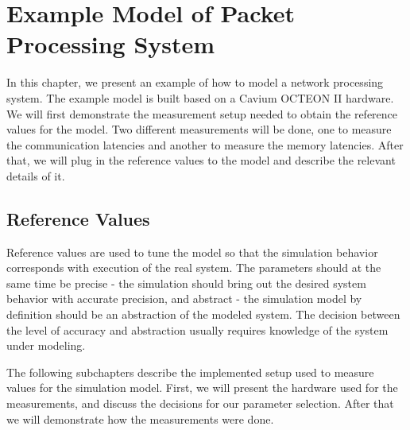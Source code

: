 \chapter{Example Model of Packet Processing System}
\label{chapter:example-simulation-model}

In this chapter, we present an example of how to model a network processing system. The example model is built based on a Cavium OCTEON II hardware. We will first demonstrate the measurement setup needed to obtain the reference values for the model. Two different measurements will be done, one to measure the communication latencies and another to measure the memory latencies. After that, we will plug in the reference values to the model and describe the relevant details of it.

\section{Reference Values}
\label{sec:reference-values}

Reference values are used to tune the model so that the simulation behavior corresponds with execution of the real system. The parameters should at the same time be precise - the simulation should bring out the desired system behavior with accurate precision, and abstract - the simulation model by definition should be an abstraction of the modeled system. The decision between the level of accuracy and abstraction usually requires knowledge of the system under modeling.

The following subchapters describe the implemented setup used to measure values for the simulation model. First, we will present the hardware used for the measurements, and discuss the decisions for our parameter selection. After that we will demonstrate how the measurements were done.




